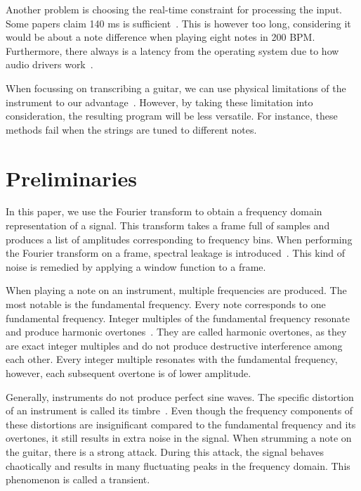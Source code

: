 \documentclass[10pt,twocolumn]{article}
\begin{document}
Another problem is choosing the real-time constraint for processing the input. Some papers claim 140 ms is sufficient~\cite{sloomboi}. This is however too long, considering it would be about a note difference when playing eight notes in 200 BPM. Furthermore, there always is a latency from the operating system due to how audio drivers work~\cite{os}.  %

When focussing on transcribing a guitar, we can use physical limitations of the instrument to our advantage~\cite{physical}. However, by taking these limitation into consideration, the resulting program will be less versatile. For instance, these methods fail when the strings are tuned to different notes.


\section{Preliminaries}
In this paper, we use the Fourier transform to obtain a frequency domain representation of a signal. This transform takes a frame full of samples and produces a list of amplitudes corresponding to frequency bins. When performing the Fourier transform on a frame, spectral leakage is introduced~\cite{spectral}. This kind of noise is remedied by applying a window function to a frame. %

When playing a note on an instrument, multiple frequencies are produced. The most notable is the fundamental frequency. Every note corresponds to one fundamental frequency. Integer multiples of the fundamental frequency resonate and produce harmonic overtones~\cite{overtones}. They are called harmonic overtones, as they are exact integer multiples and do not produce destructive interference among each other. Every integer multiple resonates with the fundamental frequency, however, each subsequent overtone is of lower amplitude.  %

Generally, instruments do not produce perfect sine waves. The specific distortion of an instrument is called its timbre~\cite{timbre}. Even though the frequency components of these distortions are insignificant compared to the fundamental frequency and its overtones, it still results in extra noise in the signal. When strumming a note on the guitar, there is a strong attack. During this attack, the signal behaves chaotically and results in many fluctuating peaks in the frequency domain. This phenomenon is called a transient.
\end{document}
